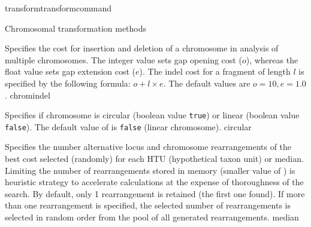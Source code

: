 \begin{command}{transform}{transformcommand}
\begin{arguments}
\begin{argumentgroup}{Chromosomal transformation methods}
\begin{description}
                        
                        {Specifies the cost for insertion and deletion of a chromosome in analysis of
                        multiple chromosomes. The integer value sets gap opening
                        cost ($o$), whereas the float value sets gap extension
                        cost ($e$).  The indel cost for a fragment of length $l$ is
                        specified by the following formula:
                       $o + l \times e$. The default values are $o=10, e=1.0$.}
                        {chromindel}
 
                        {Specifies if chromosome is circular (boolean value 
                        \texttt{true}) or linear (boolean value \texttt{false}).
                        The default value of  is
                        \texttt{false} (linear chromosome).}
                        {circular}

       		      
                        {Specifies the number alternative locus and chromosome
                        rearrangements of the best cost selected (randomly) for
                        each HTU (hypothetical taxon unit) or median. Limiting the number of rearrangements
                        stored in memory (smaller value of )
                        is heuristic strategy to accelerate calculations at the
                        expense of thoroughness of the search. By default, only 1
                        rearrangement is retained (the first one found). If more than
                        one rearrangement is specified, the selected number of
                        rearrangements is selected in random order from the pool of
                        all generated rearrangements.}
                        {median}


\end{description}
\end{argumentgroup}
\end{arguments}
\end{command}
